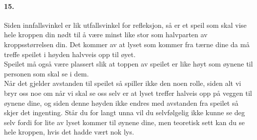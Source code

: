 \documentclass[11pt, A4paper,norsk]{article}
\begin{document}
		\paragraph{15.}
			\begin{flushleft}
Siden innfallsvinkel er lik utfallsvinkel for refleksjon, så er et speil som skal vise hele kroppen din nødt til å være minst like stor som halvparten av kroppsstørrelsen din. Det kommer av at lyset som kommer fra tærne dine da må treffe speilet i høyden halvveis opp til øyet. \\

Speilet må også være plassert slik at toppen av speilet er like høyt som øynene til personen som skal se i dem. \\

Når det gjelder avstanden til speilet så spiller ikke den noen rolle, siden alt vi bryr oss noe om når vi skal se oss selv er at lyset treffer halveis opp på veggen til øynene dine, og siden denne høyden ikke endres med avstanden fra speilet så skjer det ingenting. Står du for langt unna vil du selvfølgelig ikke kunne se deg selv fordi for lite av lyset kommer til øynene dine, men teoretisk sett kan du se hele kroppen, hvis det hadde vært nok lys.
			\end{flushleft}
			
\end{document}
